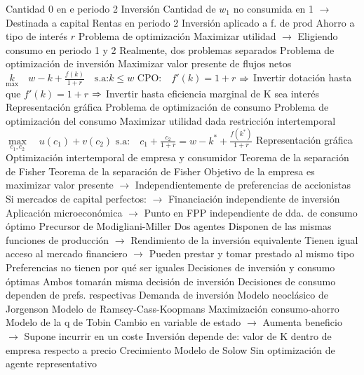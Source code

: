 \documentclass{nuevotema}
\begin{document}
\begin{esquemal}
				\4[] Cantidad 0 en e periodo 2
				\4 Inversión
				\4[] Cantidad de $w_1$ no consumida en 1
				\4[] $\to$ Destinada a capital
				\4 Rentas en periodo 2
				\4[] Inversión aplicado a f. de prod
				\4[] Ahorro a tipo de interés $r$
				\4 Problema de optimización
				\4[] Maximizar utilidad
				\4[] $\to$ Eligiendo consumo en periodo 1 y 2
				\4 Realmente, dos problemas separados
				\4[I] Problema de optimización de inversión
				\4[] Maximizar valor presente de flujos netos
				\4[] $\underset{\max}{k} \quad w-k + \frac{f(k)}{1+r} \quad \text{s.a:} k \leq w$
				\4[] $\text{CPO:} \quad f'(k) = 1+r$
				\4[] $\then$ Invertir dotación hasta que $f'(k) = 1+r$
				\4[] $\then$ Invertir hasta eficiencia marginal de K sea interés
				\4[] Representación gráfica
				\4[] 
				\4[II] Problema de optimización de consumo
				\4 Problema de optimización del consumo
				\4[] Maximizar utilidad dada restricción intertemporal
				\4[] $\underset{c_1, c_2}{\max} \quad u(c_1) + v(c_2)$
				\4[] $\text{s.a:} \quad c_1 + \frac{c_2}{1+r} = w -k^* + \frac{f(k^*)}{1+r}$
				\4[] Representación gráfica
				\4[] 
				\4 Optimización intertemporal de empresa y consumidor
				\4[$\then$] Teorema de la separación de Fisher
			\3 Teorema de la separación de Fisher
				\4 Objetivo de la empresa es maximizar valor presente
				\4[] $\to$ Independientemente de preferencias de accionistas
				\4 Si mercados de capital perfectos:
				\4[] $\to$ Financiación independiente de inversión
				\4 Aplicación microeconómica
				\4[] $\to$ Punto en FPP independiente de dda. de consumo óptimo
				\4 Precursor de Modigliani-Miller
				\4 Dos agentes
				\4[] Disponen de las mismas funciones de producción
				\4[] $\to$ Rendimiento de la inversión equivalente
				\4[] Tienen igual acceso al mercado financiero
				\4[] $\to$ Pueden prestar y tomar prestado al mismo tipo
				\4[] Preferencias no tienen por qué ser iguales
				\4 Decisiones de inversión y consumo óptimas
				\4[] Ambos tomarán misma decisión de inversión
				\4[] Decisiones de consumo dependen de prefs. respectivas
			\3 Demanda de inversión
				\4 Modelo neoclásico de Jorgenson
				\4 Modelo de Ramsey-Cass-Koopmans
				\4[] Maximización consumo-ahorro
				\4 Modelo de la q de Tobin
				\4[] Cambio en variable de estado
				\4[] $\to$ Aumenta beneficio
				\4[] $\to$ Supone incurrir en un coste
				\4[] Inversión depende de:
				\4[] valor de K dentro de empresa respecto a precio
			\3 Crecimiento
				\4 Modelo de Solow
				\4[] Sin optimización de agente representativo

\end{esquemal}
\end{document}
